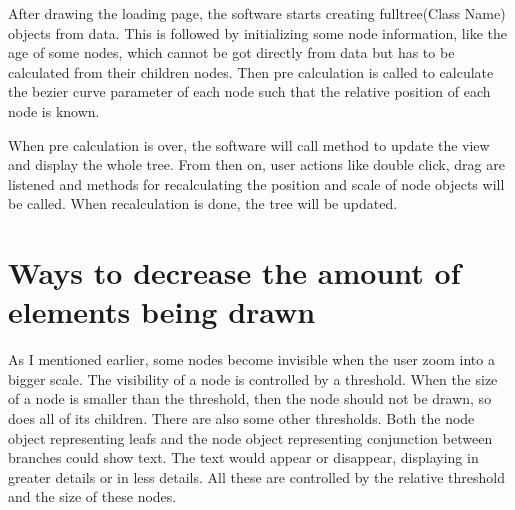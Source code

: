 \documentclass[MSc]{icldt}
\begin{document}
After drawing the loading page, the software starts creating fulltree(Class Name) objects from data. This is followed by initializing some node information, like the age of some nodes, which cannot be got directly from data but has to be calculated from their children nodes. Then pre calculation is called to calculate the bezier curve parameter of each node such that the relative position of each node is known. 

When pre calculation is over, the software will call method to update the view and display the whole tree. From then on, user actions like double click, drag are listened and methods for recalculating the position and scale of node objects will be called. When recalculation is done, the tree will be updated. 


\section{Ways to decrease the amount of elements being drawn}

As I mentioned earlier, some nodes become invisible when the user zoom into a bigger scale. The visibility of a node is controlled by a threshold. When the size of a node is smaller than the threshold, then the node should not be drawn, so does all of its children. There are also some other thresholds. Both the node object representing leafs and the node object representing conjunction between branches could show text. The text would appear or disappear, displaying in greater details or in less details. All these are controlled by the relative threshold and the size of these nodes. 
\end{document}
